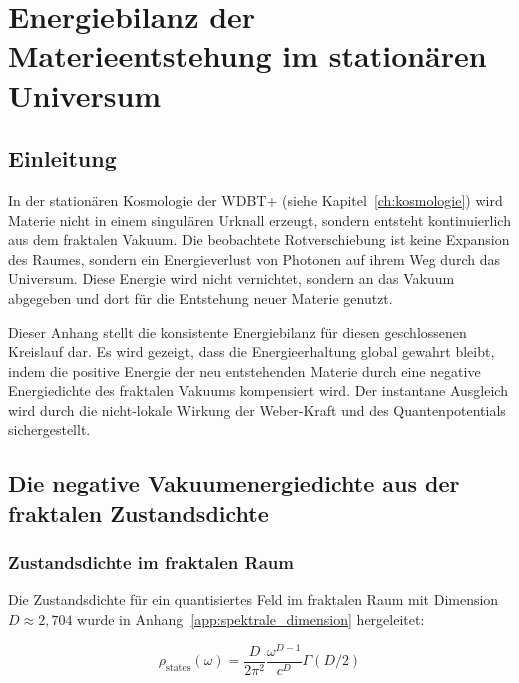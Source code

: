 
\chapter{Energiebilanz der Materieentstehung im stationären Universum}
\label{app:materieentstehung}

\section{Einleitung}
\label{app:materieentstehung_einleitung}

In der stationären Kosmologie der WDBT+ (siehe Kapitel~\ref{ch:kosmologie}) wird Materie
nicht in einem singulären Urknall erzeugt, sondern entsteht kontinuierlich aus dem
fraktalen Vakuum. Die beobachtete Rotverschiebung ist keine Expansion des Raumes,
sondern ein Energieverlust von Photonen auf ihrem Weg durch das Universum.
Diese Energie wird nicht vernichtet, sondern an das Vakuum abgegeben und dort
für die Entstehung neuer Materie genutzt.

Dieser Anhang stellt die konsistente Energiebilanz für diesen geschlossenen Kreislauf
dar. Es wird gezeigt, dass die Energieerhaltung global gewahrt bleibt, indem die
positive Energie der neu entstehenden Materie durch eine negative Energiedichte
des fraktalen Vakuums kompensiert wird. Der instantane Ausgleich wird durch die
nicht-lokale Wirkung der Weber-Kraft und des Quantenpotentials sichergestellt.

\section{Die negative Vakuumenergiedichte aus der fraktalen Zustandsdichte}
\label{app:materieentstehung_vakuum}

\subsection{Zustandsdichte im fraktalen Raum}
\label{sub:materieentstehung_zustandsdichte}

Die Zustandsdichte für ein quantisiertes Feld im fraktalen Raum mit Dimension
\( D \approx 2,704 \) wurde in Anhang~\ref{app:spektrale_dimension} hergeleitet:

\[
\rho_{\text{states}}(\omega) = \frac{D}{2\pi^2} \frac{\omega^{D-1}}{c^D} \Gamma(D/2)
\]

